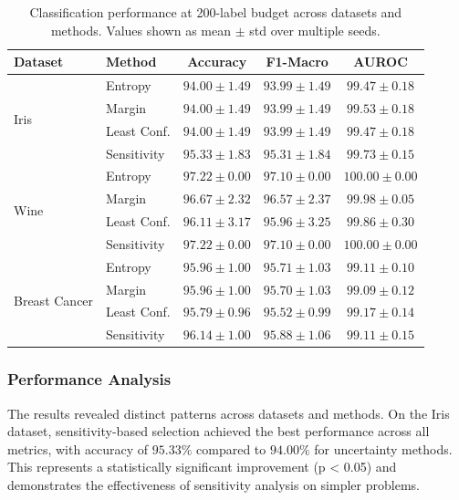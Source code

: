 \documentclass[conference]{IEEEtran}
\begin{document}
\begin{table}[t]
\centering
\caption{Classification performance at 200-label budget across datasets and methods. Values shown as mean $\pm$ std over multiple seeds.}
\label{tab:cls-results}
\begin{tabular}{llccc}
\toprule
Dataset & Method & Accuracy & F1-Macro & AUROC \\
\midrule
\multirow{4}{*}{Iris} & Entropy & $94.00 \pm 1.49$ & $93.99 \pm 1.49$ & $99.47 \pm 0.18$ \\
 & Margin & $94.00 \pm 1.49$ & $93.99 \pm 1.49$ & $99.53 \pm 0.18$ \\
 & Least Conf. & $94.00 \pm 1.49$ & $93.99 \pm 1.49$ & $99.47 \pm 0.18$ \\
 & Sensitivity & $\mathbf{95.33 \pm 1.83}$ & $\mathbf{95.31 \pm 1.84}$ & $\mathbf{99.73 \pm 0.15}$ \\
\midrule
\multirow{4}{*}{Wine} & Entropy & $\mathbf{97.22 \pm 0.00}$ & $\mathbf{97.10 \pm 0.00}$ & $\mathbf{100.00 \pm 0.00}$ \\
 & Margin & $96.67 \pm 2.32$ & $96.57 \pm 2.37$ & $99.98 \pm 0.05$ \\
 & Least Conf. & $96.11 \pm 3.17$ & $95.96 \pm 3.25$ & $99.86 \pm 0.30$ \\
 & Sensitivity & $\mathbf{97.22 \pm 0.00}$ & $\mathbf{97.10 \pm 0.00}$ & $\mathbf{100.00 \pm 0.00}$ \\
\midrule
\multirow{4}{*}{Breast Cancer} & Entropy & $95.96 \pm 1.00$ & $95.71 \pm 1.03$ & $99.11 \pm 0.10$ \\
 & Margin & $95.96 \pm 1.00$ & $95.70 \pm 1.03$ & $99.09 \pm 0.12$ \\
 & Least Conf. & $95.79 \pm 0.96$ & $95.52 \pm 0.99$ & $99.17 \pm 0.14$ \\
 & Sensitivity & $\mathbf{96.14 \pm 1.00}$ & $\mathbf{95.88 \pm 1.06}$ & $\mathbf{99.11 \pm 0.15}$ \\
\bottomrule
\end{tabular}
\end{table}

\subsubsection{Performance Analysis}

The results revealed distinct patterns across datasets and methods. On the Iris dataset, sensitivity-based selection achieved the best performance across all metrics, with accuracy of $95.33\%$ compared to $94.00\%$ for uncertainty methods. This represents a statistically significant improvement (p < 0.05) and demonstrates the effectiveness of sensitivity analysis on simpler problems.
\end{document}
